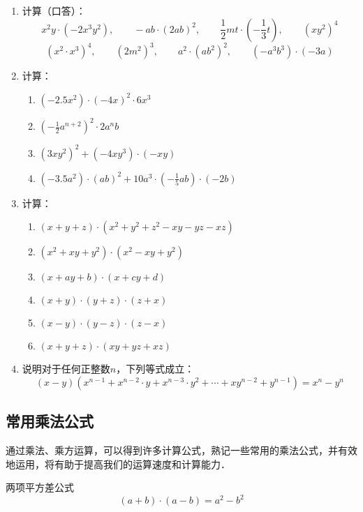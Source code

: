 \begin{ex}
\begin{enumerate}
    \item 计算（口答）：
    \[x^2y\cdot (-2x^3y^2),\qquad -ab\cdot (2ab)^2,\qquad \frac{1}{2}mt\cdot \left(-\frac{1}{3}t\right),\qquad (xy^2)^4 \]
    \[(x^2\cdot x^3)^4,\qquad (2m^2)^3,\qquad a^2\cdot (ab^2)^2,\qquad (-a^3b^3)\cdot (-3a) \]
    \item 计算：
\begin{enumerate}
    \item $(-2.5x^2)\cdot (-4x)^2\cdot 6x^3$
    \item $\left(-\frac{1}{2}a^{n+2}\right)^2\cdot 2a^n b$
    \item $(3xy^2)^2+(-4xy^3)\cdot (-xy)$
    \item $(-3.5a^2)\cdot (ab)^2+10a^3\cdot \left(-\frac{1}{5}ab\right)\cdot (-2b)$
\end{enumerate}
\item 计算：
\begin{enumerate}
    \item $(x+y+z)\cdot (x^2+y^2+z^2-xy-yz-xz)$
    \item $(x^2+xy+y^2)\cdot (x^2-xy+y^2)$
    \item $(x+ay+b)\cdot (x+cy+d)$
    \item $(x+y)\cdot (y+z)\cdot(z+x)$
    \item $(x-y)\cdot (y-z)\cdot(z-x)$
    \item $(x+y+z)\cdot (xy+yz+xz)$
\end{enumerate}
\item 说明对于任何正整数$n$，下列等式成立：
\[(x-y)\left(x^{n-1}+x^{n-2}\cdot y+x^{n-3}\cdot y^2+\cdots+xy^{n-2}+y^{n-1}\right)=x^n-y^n \]
\end{enumerate}
\end{ex}    

\subsection{常用乘法公式}

通过乘法、乘方运算，可以得到许多计算公式，熟记一些常用的乘法公式，并有效地运用，将有助于提高我们的运算速度和计算能力．

\begin{blk}{两项平方差公式}
    \begin{equation*}
        (a+b) \cdot (a-b) =a^2-b^2 \tag{I}  
    \end{equation*}
\end{blk}

